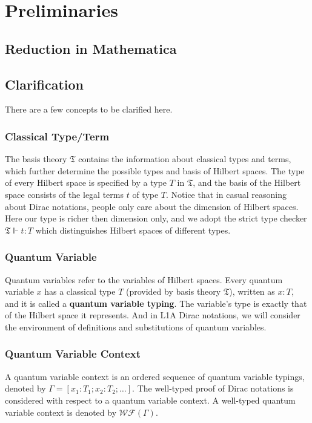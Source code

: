 \section{Preliminaries}

\subsection{Reduction in Mathematica}

\subsection{Clarification}
There are a few concepts to be clarified here.

\subsubsection*{Classical Type/Term}
The basis theory $\mathfrak{T}$ contains the information about classical types and terms, which further determine the possible types and basis of Hilbert spaces. The type of every Hilbert space is specified by a type $T$ in $\mathfrak{T}$, and the basis of the Hilbert space consists of the legal terms $t$ of type $T$. Notice that in casual reasoning about Dirac notations, people only care about the dimension of Hilbert spaces. Here our type is richer then dimension only, and we adopt the strict type checker $\mathfrak{T} \Vdash t : T$ which distinguishes Hilbert spaces of different types.


\subsubsection*{Quantum Variable}
Quantum variables refer to the variables of Hilbert spaces. Every quantum variable $x$ has a classical type $T$ (provided by basis theory $\mathfrak{T}$), written as $x : T$, and it is called a \textbf{quantum variable typing}. The variable's type is exactly that of the Hilbert space it represents. And in L1A Dirac notations, we will consider the environment of definitions and substitutions of quantum variables.

\subsubsection*{Quantum Variable Context}
A quantum variable context is an ordered sequence of quantum variable typings, denoted by $\Gamma = [x_1 : T_1; x_2 : T_2; \dots]$. The well-typed proof of Dirac notations is considered with respect to a quantum variable context. A well-typed quantum variable context is denoted by $\mathcal{WF}(\Gamma)$.

